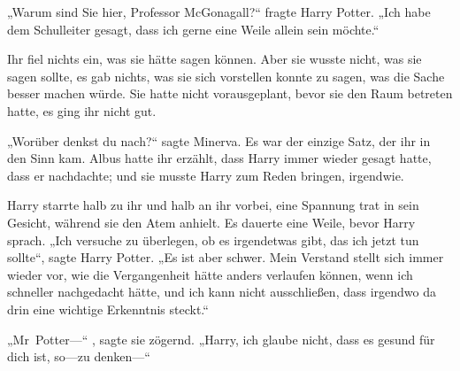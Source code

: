 „Warum sind Sie hier, Professor McGonagall?“ fragte Harry Potter. „Ich habe dem Schulleiter gesagt, dass ich gerne eine Weile allein sein möchte.“

Ihr fiel nichts ein, was sie hätte sagen können. Aber sie wusste nicht, was sie sagen sollte, es gab nichts, was sie sich vorstellen konnte zu sagen, was die Sache besser machen würde. Sie hatte nicht vorausgeplant, bevor sie den Raum betreten hatte, es ging ihr nicht gut.

„Worüber denkst du nach?“ sagte Minerva.
Es war der einzige Satz, der ihr in den Sinn kam. Albus hatte ihr erzählt, dass Harry immer wieder gesagt hatte, dass er nachdachte; und sie musste Harry zum Reden bringen, irgendwie.



Harry starrte halb zu ihr und halb an ihr vorbei, eine Spannung trat in sein Gesicht, während sie den Atem anhielt. Es dauerte eine Weile, bevor Harry sprach. „Ich versuche zu überlegen, ob es irgendetwas gibt, das ich jetzt tun sollte“, sagte Harry Potter. „Es ist aber schwer. Mein Verstand stellt sich immer wieder vor, wie die Vergangenheit hätte anders verlaufen können, wenn ich schneller nachgedacht hätte, und ich kann nicht ausschließen, dass irgendwo da drin eine wichtige Erkenntnis steckt.“

„Mr~Potter—“ , sagte sie zögernd. „Harry, ich glaube nicht, dass es gesund für dich ist, so—zu denken—“

